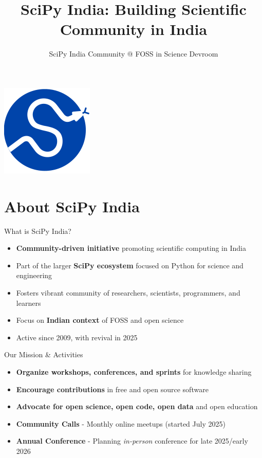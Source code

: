 \documentclass[16pt,t]{beamer}
\title[]{
\textbf{SciPy India: Building Scientific Community in India}}
\author{SciPy India Community @ FOSS in Science Devroom}
\date{}
\begin{document}
\begin{frame}[Title]
\begin{center}
\includegraphics[scale=0.65]{Figures/SciPy_India_logo.png}
\end{center}
\maketitle
\end{frame}


\section{About SciPy India}

\begin{frame}{What is SciPy India?}
\begin{itemize}
    \item \textbf{Community-driven initiative} promoting scientific computing in India
    \item Part of the larger \textbf{SciPy ecosystem} focused on Python for science and engineering
    \item Fosters vibrant community of researchers, scientists, programmers, and learners
    \item Focus on \textbf{Indian context} of FOSS and open science
    \item Active since 2009, with revival in 2025
\end{itemize}
\end{frame}

\begin{frame}{Our Mission \& Activities}
\begin{itemize}
    \item \textbf{Organize workshops, conferences, and sprints} for knowledge sharing
    \item \textbf{Encourage contributions} in free and open source software
    \item \textbf{Advocate for open science, open code, open data} and open education
    \item \textbf{Community Calls} - Monthly online meetups (started July 2025)
    \item \textbf{Annual Conference} - Planning \textit{in-person} conference for late 2025/early 2026
\end{itemize}
\end{frame}
\end{document}
